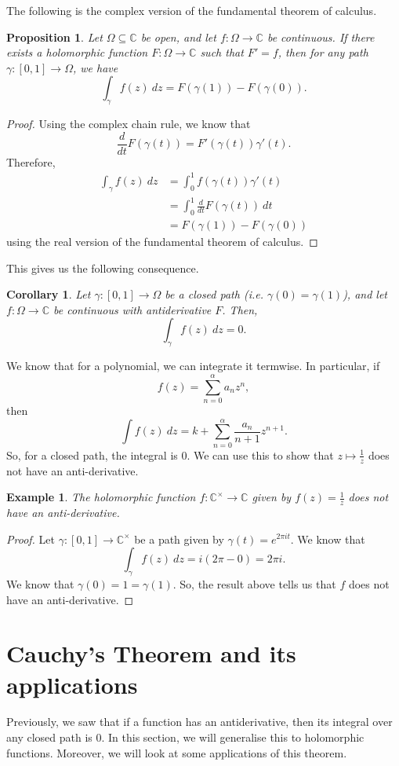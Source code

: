 \documentclass[a4paper, openany]{memoir}
\theoremstyle{definition}
\theoremstyle{plain}
\newtheorem{proposition}[definition]{Proposition}
\newtheorem{corollary}[definition]{Corollary}
\newtheorem{example}[definition]{Example}
\begin{document}
The following is the complex version of the fundamental theorem of calculus.
\begin{proposition}
Let $\Omega \subseteq \mathbb{C}$ be open, and let $f: \Omega \to \mathbb{C}$ be continuous. If there exists a holomorphic function $F: \Omega \to \mathbb{C}$ such that $F' = f$, then for any path $\gamma: [0, 1] \to \Omega$, we have
\[\int_\gamma f(z) \ dz = F(\gamma(1)) - F(\gamma(0)).\]
\end{proposition}
\begin{proof}
Using the complex chain rule, we know that
\[\frac{d}{dt}F(\gamma(t)) = F'(\gamma(t)) \gamma'(t).\]
Therefore,
\begin{align*}
    \int_\gamma f(z) \ dz &= \int_0^1 f(\gamma(t)) \gamma'(t) \\
    &= \int_0^1 \frac{d}{dt} F(\gamma(t)) \ dt \\
    &= F(\gamma(1)) - F(\gamma(0))
\end{align*}
using the real version of the fundamental theorem of calculus.
\end{proof}

This gives us the following consequence.
\begin{corollary}
Let $\gamma: [0, 1] \to \Omega$ be a closed path (i.e. $\gamma(0) = \gamma(1)$), and let $f: \Omega \to \mathbb{C}$ be continuous with antiderivative $F$. Then,
\[\int_\gamma f(z) \ dz = 0.\]
\end{corollary}
We know that for a polynomial, we can integrate it termwise. In particular, if
\[f(z) = \sum_{n=0}^{\alpha} a_n z^n,\]
then
\[\int f(z) \ dz = k + \sum_{n=0}^\alpha \frac{a_n}{n+1} z^{n+1}.\]
So, for a closed path, the integral is 0. We can use this to show that $z \mapsto \frac{1}{z}$ does not have an anti-derivative.
\begin{example}
The holomorphic function $f: \mathbb{C}^\times \to \mathbb{C}$ given by $f(z) = \frac{1}{z}$ does not have an anti-derivative.
\end{example}
\begin{proof}
Let $\gamma: [0, 1] \to \mathbb{C}^\times$ be a path given by $\gamma(t) = e^{2\pi it}$. We know that
\[\int_\gamma f(z) \ dz = i(2\pi - 0) = 2\pi i.\]
We know that $\gamma(0) = 1 = \gamma(1)$. So, the result above tells us that $f$ does not have an anti-derivative.
\end{proof}

\newpage

\section{Cauchy's Theorem and its applications}
Previously, we saw that if a function has an antiderivative, then its integral over any closed path is 0. In this section, we will generalise this to holomorphic functions. Moreover, we will look at some applications of this theorem.
\end{document}
